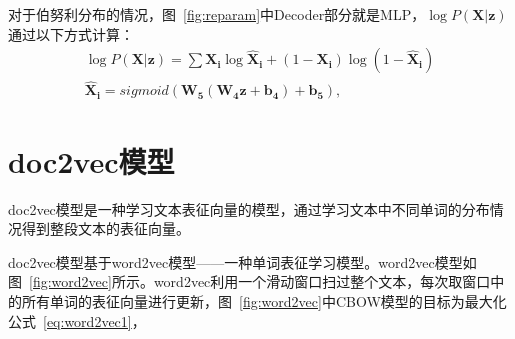 对于伯努利分布的情况，图~\ref{fig:reparam}中Decoder部分就是MLP，$\log P(\bm X|\bm z)$通过以下方式计算：
\begin{equation}
  \begin{gathered}
  \label{eq:bernoulli}
\log P(\bm X|\bm z) = \sum \bm {X_i}\log\bm {\hat X_i} + (1-\bm {X_i})\log(1 - \bm {\hat X_i}) \\
\bm {\hat X_i} = sigmoid(\bm {W_5}(\bm {W_4}\bm z + \bm {b_4}) + \bm {b_5}),
  \end{gathered}
\end{equation}

\section{doc2vec模型}
doc2vec模型是一种学习文本表征向量的模型，通过学习文本中不同单词的分布情况得到整段文本的表征向量。\par
doc2vec模型基于word2vec模型——一种单词表征学习模型。word2vec模型如图~\ref{fig:word2vec}所示。word2vec利用一个滑动窗口扫过整个文本，每次取窗口中的所有单词的表征向量进行更新，图~\ref{fig:word2vec}中CBOW模型的目标为最大化公式~\ref{eq:word2vec1}，

